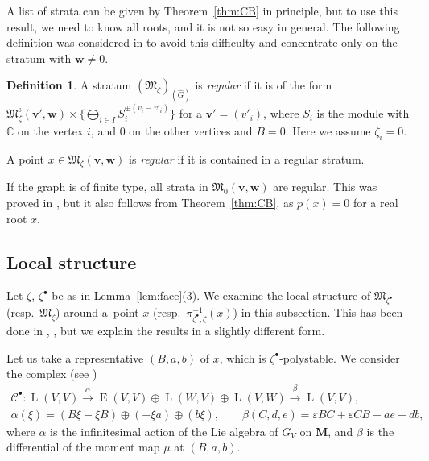 \documentclass[11pt]{article}
\theoremstyle{definition}
\newtheorem{Definition}[equation]{Definition}
\numberwithin{equation}{section}
\newcommand{\thmref}[1]{Theorem~\ref{#1}}
\newcommand{\lemref}[1]{Lemma~\ref{#1}}
\newcommand{\C}{{\mathbb C}}
\newcommand{\bM}{{\mathbf M}} %
\newcommand{\M}{{\mathfrak M}} %
\newcommand{\Mreg}{\M^{\operatorname{s}}}
\newcommand{\bv}{{\mathbf v}} %
\newcommand{\bw}{{\mathbf w}} %
\newcommand{\HomE}{\operatorname{E}}
\newcommand{\HomL}{\operatorname{L}}
\begin{document}
A list of strata can be given by \thmref{thm:CB} in principle, but to
use this result, we need to know all roots, and it is not so easy in
general.
%
The following def\/inition was considered in \cite[2.6.4]{Na-qaff} to
avoid this dif\/f\/iculty and concentrate only on the stratum with $\bw
\neq 0$.

\begin{Definition}
  A stratum $(\M_\zeta)_{(\widehat G)}$ is {\it regular\/} if it is of
  the form $\Mreg_\zeta(\bv',\bw)\times\{ \bigoplus_{i\in I}
  S_i^{\oplus (v_i - v'_i)}\}$ for a $\bv' = (v'_i)$, where $S_i$ is
  the module with $\C$ on the vertex $i$, and $0$ on the other
  vertices and $B = 0$. Here we assume $\zeta_i = 0$.

  A point $x\in\M_\zeta(\bv,\bw)$ is {\it regular\/} if it is contained in
  a regular stratum.
\end{Definition}

If the graph is of f\/inite type, all strata in $\M_0(\bv,\bw)$ are
regular. This was proved in \cite[6.7]{Na-quiver}, but it also follows
from \thmref{thm:CB}, as $p(x) = 0$ for a real root $x$.

\subsection{Local structure}\label{subsec:local}

Let $\zeta$, $\zeta^\bullet$ be as in \lemref{lem:face}(3).
%
We examine the local structure of $\M_{\zeta^\bullet}$ (resp.\ $\M_{\zeta}$)
around a~point $x$ (resp.\ $\pi_{\zeta^\bullet,\zeta}^{-1}(x)$) in this
subsection. This has been done in \cite[Section~6]{Na-quiver},
\cite[Section~3.2]{Na-qaff}, but we explain the results in a slightly
dif\/ferent form.

Let us take a representative $(B,a,b)$ of $x$, which is
$\zeta^\bullet$-polystable. We consider the complex (see
\cite[(3.11)]{Na-alg})
\begin{gather}
   \mathscr{C}^\bullet :
   \HomL(V,V) \xrightarrow{\alpha}
   \HomE(V,V)\oplus\HomL(W,V) \oplus \HomL(V,W) \xrightarrow{\beta}
   \HomL(V,V),
\nonumber\\
   \alpha(\xi) = (B\xi-\xi B)\oplus (-\xi a) \oplus (b\xi), \qquad
   \beta(C,d,e) = \varepsilon B C + \varepsilon C B + a e + d b,\label{eq:tancpx}
\end{gather}
where $\alpha$ is the inf\/initesimal action of the Lie algebra of $G_V$
on $\bM$, and $\beta$ is the dif\/ferential of the moment map $\mu$ at
$(B,a,b)$.
\end{document}
